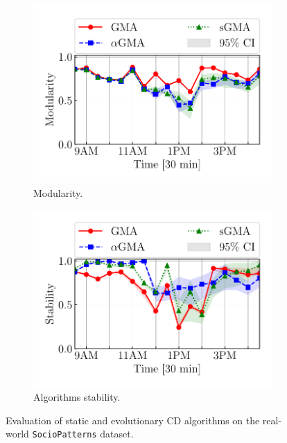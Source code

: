 \documentclass[letterpaper]{article}
\begin{document}
\begin{figure}[!t]
    \centering
    \begin{subfigure}[b]{.5\linewidth}
        \centering
        \includegraphics[width=\linewidth]{figures/realcase2.pdf}
        \caption{Modularity.}
        \label{fig:real_modularity}
    \end{subfigure}
    \hspace{-.5em}
    \begin{subfigure}[b]{.5\linewidth}
        \centering
        \includegraphics[width=\linewidth]{figures/realcase_stability2.pdf}
        \caption{Algorithms stability.}
        \label{fig:real_stability}
    \end{subfigure}
    \caption{Evaluation of static and evolutionary CD algorithms on the real-world \texttt{SocioPatterns} dataset.}
    \label{fig:realcase}
\end{figure}
\end{document}
